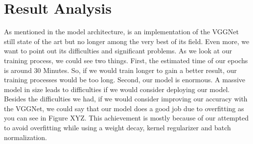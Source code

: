 \documentclass[journal]{IEEEtran}
\begin{document}
\section{Result Analysis}
As mentioned in the model architecture, is an implementation of the VGGNet still state of the art but no longer among the very best of its field. Even more, we want to point out its difficulties and significant problems. As we look at our training process, we could see two things. First, the estimated time of our epochs is around 30 Minutes. So, if we would train longer to gain a better result, our training processes would be too long. Second, our model is enormous.  A massive model in size leads to difficulties if we would consider deploying our model.\\
Besides the difficulties we had, if we would consider improving our accuracy with the VGGNet, we could say that our model does a good job due to overfitting as you can see in Figure XYZ. This achievement is mostly because of our attempted to avoid overfitting while using a weight decay, kernel regularizer and batch normalization. 

\ifCLASSOPTIONcaptionsoff
  \newpage
\fi


\vfill
\end{document}
